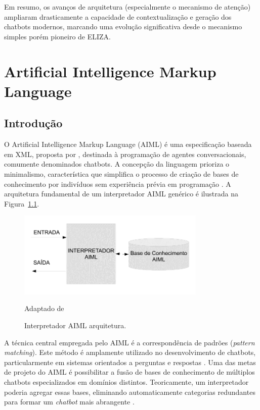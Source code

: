 \documentclass[14pt,a4paper,oneside]{book}
\begin{document}
Em resumo, os avanços de arquitetura (especialmente o mecanismo de atenção) ampliaram drasticamente a capacidade de contextualização e geração dos chatbots modernos, marcando uma evolução significativa desde o mecanismo simples porém pioneiro de ELIZA.



\chapter{Artificial Intelligence Markup
Language}

\section{Introdução}

O Artificial Intelligence Markup Language (AIML) é uma especificação baseada em XML, proposta por \cite{Wallace2009}, destinada à programação de agentes conversacionais, comumente denominados chatbots. A concepção da linguagem prioriza o minimalismo, característica que simplifica o processo de criação de bases de conhecimento por indivíduos sem experiência prévia em programação \cite{Wallace2009}. A arquitetura fundamental de um interpretador AIML genérico é ilustrada na Figura~\ref{fig:interpretador}.

\begin{figure}
    \centering
    \caption{Interpretador AIML arquitetura.}
    \includegraphics[width=0.8\textwidth]{./fig/image8.png} %
    \label{fig:interpretador}
    \vspace{0.2cm} %
    {\footnotesize 
	
	Adaptado de \cite{Silva2007}}
\end{figure}

A técnica central empregada pelo AIML é a correspondência de padrões (\emph{pattern matching}). Este método é amplamente utilizado no desenvolvimento de chatbots, particularmente em sistemas orientados a perguntas e respostas \cite{Abdul-Kader2015}. Uma das metas de projeto do AIML é possibilitar a fusão de bases de conhecimento de múltiplos chatbots especializados em domínios distintos. Teoricamente, um interpretador poderia agregar essas bases, eliminando automaticamente categorias redundantes para formar um \emph{chatbot} mais abrangente \cite{Wallace2000}.
\end{document}

